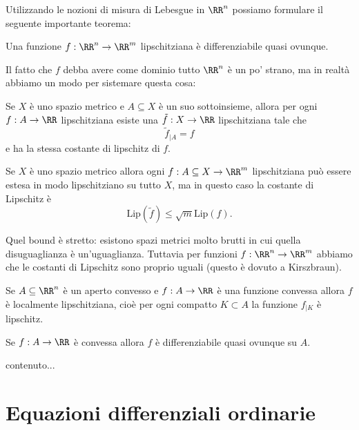 \documentclass[11pt]{scrartcl}
\begin{document}
	Utilizzando le nozioni di misura di Lebesgue in $\RR^n$ possiamo formulare il seguente importante teorema:
	\begin{theorem*}[Rademacher]
		Una funzione $f:\RR^n\to\RR^m$ lipschitziana è differenziabile quasi ovunque.
	\end{theorem*}
	Il fatto che $f$ debba avere come dominio tutto $\RR^n$ è un po' strano, ma in realtà abbiamo un modo per sistemare questa cosa:
	\begin{theorem}
		Se $X$ è uno spazio metrico e $A\subseteq X$ è un suo sottoinsieme, allora per ogni $f:A\to\RR$ lipschitziana esiste una $\tilde{f}:X\to\RR$ lipschitziana tale che
		$$\tilde{f}_{\mid A}=f$$
		e ha la stessa costante di lipschitz di $f$.
	\end{theorem}
	\begin{corollary}
		Se $X$ è uno spazio metrico allora ogni $f:A\subseteq X \to \RR^m$ lipschitziana può essere estesa in modo lipschitziano su tutto $X$, ma in questo caso la costante di Lipschitz è
		$$\text{Lip}(\tilde{f})\le \sqrt{m}\text{Lip}(f).$$
	\end{corollary}
	Quel bound è stretto: esistono spazi metrici molto brutti in cui quella disuguaglianza è un'uguaglianza. Tuttavia per funzioni $f:\RR^n\to\RR^m$ abbiamo che le costanti di Lipschitz sono proprio uguali (questo è dovuto a Kirszbraun).
	\begin{theorem}
		Se $A\subseteq\RR^n$ è un aperto convesso e $f:A\to\RR$ è una funzione convessa allora $f$ è localmente lipschitziana, cioè per ogni compatto $K\subset A$ la funzione $f_{\mid K}$ è lipschitz.
	\end{theorem}
	\begin{corollary}
		Se $f:A\to\RR$ è convessa allora $f$ è differenziabile quasi ovunque su $A$.
	\end{corollary}
	\begin{theorem}[Alexandrov]
		contenuto...
	\end{theorem}
	
	\newpage
	
	\section{Equazioni differenziali ordinarie}
	
\end{document}

